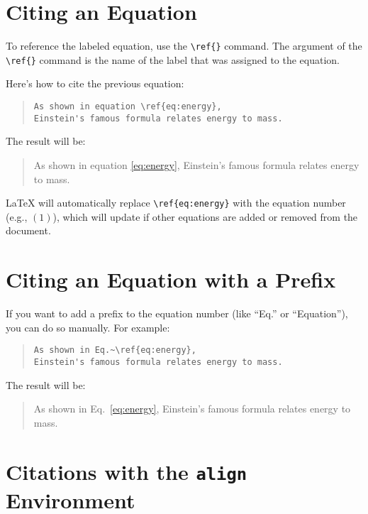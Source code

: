 \section{Citing an Equation}

To reference the labeled equation, use the \verb|\ref{}| command. The argument of the \verb|\ref{}| command is the name of the label that was assigned to the equation.

Here's how to cite the previous equation:

\begin{quote}
\begin{verbatim}
As shown in equation \ref{eq:energy},
Einstein's famous formula relates energy to mass.
\end{verbatim}
\end{quote}

The result will be:

\begin{quote}
    As shown in equation \ref{eq:energy},
    Einstein's famous formula relates energy to mass.
\end{quote}

LaTeX will automatically replace \verb|\ref{eq:energy}| with the equation number (e.g., \((1)\)), which will update if other equations are added or removed from the document.

\section{Citing an Equation with a Prefix}

If you want to add a prefix to the equation number (like ``Eq.'' or ``Equation''), you can do so manually. For example:

\begin{quote}
\begin{verbatim}
As shown in Eq.~\ref{eq:energy},
Einstein's famous formula relates energy to mass.
\end{verbatim}
\end{quote}

The result will be:

\begin{quote}
    As shown in Eq.~\ref{eq:energy},
    Einstein's famous formula relates energy to mass.
\end{quote}

\section{Citations with the \texorpdfstring{\texttt{align}}{align} Environment}

